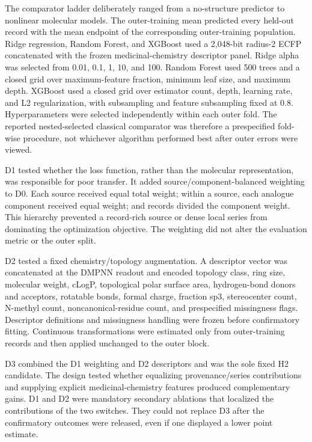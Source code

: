\documentclass[referee,lineno,pdflatex,sn-vancouver-num]{sn-jnl}
\begin{document}
The comparator ladder deliberately ranged from a no-structure predictor to nonlinear molecular models. The outer-training mean predicted every held-out record with the mean endpoint of the corresponding outer-training population. Ridge regression, Random Forest, and XGBoost used a 2,048-bit radius-2 ECFP concatenated with the frozen medicinal-chemistry descriptor panel. Ridge alpha was selected from 0.01, 0.1, 1, 10, and 100. Random Forest used 500 trees and a closed grid over maximum-feature fraction, minimum leaf size, and maximum depth. XGBoost used a closed grid over estimator count, depth, learning rate, and L2 regularization, with subsampling and feature subsampling fixed at 0.8. Hyperparameters were selected independently within each outer fold. The reported nested-selected classical comparator was therefore a prespecified fold-wise procedure, not whichever algorithm performed best after outer errors were viewed.

D1 tested whether the loss function, rather than the molecular representation, was responsible for poor transfer. It added source/component-balanced weighting to D0. Each source received equal total weight; within a source, each analogue component received equal weight; and records divided the component weight. This hierarchy prevented a record-rich source or dense local series from dominating the optimization objective. The weighting did not alter the evaluation metric or the outer split.

D2 tested a fixed chemistry/topology augmentation. A descriptor vector was concatenated at the DMPNN readout and encoded topology class, ring size, molecular weight, cLogP, topological polar surface area, hydrogen-bond donors and acceptors, rotatable bonds, formal charge, fraction sp3, stereocenter count, N-methyl count, noncanonical-residue count, and prespecified missingness flags. Descriptor definitions and missingness handling were frozen before confirmatory fitting. Continuous transformations were estimated only from outer-training records and then applied unchanged to the outer block.

D3 combined the D1 weighting and D2 descriptors and was the sole fixed H2 candidate. The design tested whether equalizing provenance/series contributions and supplying explicit medicinal-chemistry features produced complementary gains. D1 and D2 were mandatory secondary ablations that localized the contributions of the two switches. They could not replace D3 after the confirmatory outcomes were released, even if one displayed a lower point estimate.
\end{document}
